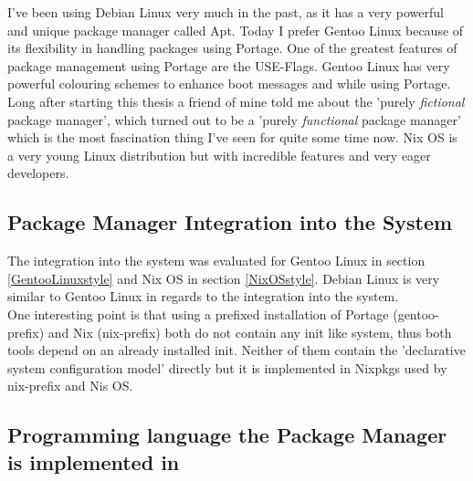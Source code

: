 \documentclass[a4paper,10pt]{article}
\begin{document}

I've been using Debian Linux very much in the past, as it has a very powerful and unique package manager called Apt. Today I prefer Gentoo Linux because of its flexibility in handling packages using Portage. One of the greatest features of package management using Portage are the USE-Flags. Gentoo Linux has very powerful colouring schemes to enhance boot messages and while using Portage. Long after starting this thesis a friend of mine told me about the 'purely \textit{fictional} package manager', which turned out to be a 'purely \textit{functional} package manager' which is the most fascination thing I've seen for quite some time now. Nix OS is a very young Linux distribution but with incredible features and very eager developers. 


\subsection{Package Manager Integration into the System}
The integration into the system was evaluated for Gentoo Linux in section \ref{GentooLinuxstyle} and Nix OS in section \ref{NixOSstyle}. Debian Linux is very similar to Gentoo Linux in regards to the integration into the system. \\

One interesting point is that using a prefixed installation of Portage (gentoo-prefix) and Nix (nix-prefix) both do not contain any init like system, thus both tools depend on an already installed init. Neither of them contain the 'declarative system configuration model' directly but it is implemented in Nixpkgs used by nix-prefix and Nis OS.




\subsection{Programming language the Package Manager is implemented in}
\end{document}
